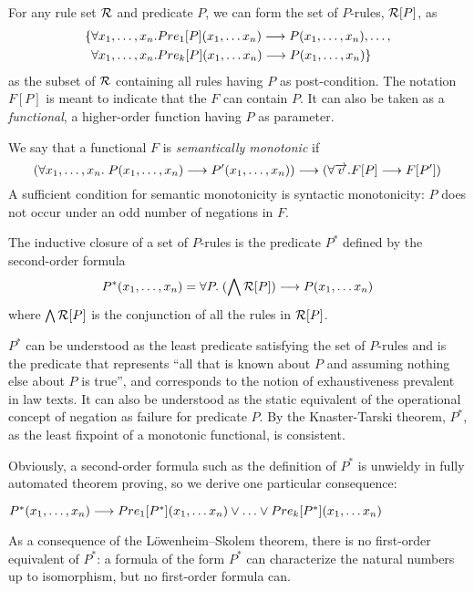 For any rule set $\cal R$ and predicate $P$, we can form the set of
$P$-rules, ${\cal R}[P]$, as
\begin{align*}
\{ & \forall x_1, \dots, x_n. Pre_1[P](x_1, \dots x_n) \longrightarrow P(x_1, \dots, x_n),
     \dots,\\
  & \forall x_1, \dots, x_n.Pre_k[P](x_1, \dots x_n)\longrightarrow P(x_1, \dots,
x_n)\}
\end{align*}
as the subset of $\cal R$ containing all rules having $P$ as
post-condition. The notation $F[P]$ is meant to indicate that the $F$ can
contain $P$. It can also be taken as a \emph{functional}, \ie{} a higher-order
function having $P$ as parameter.

We say that a functional $F$ is \emph{semantically monotonic} if
\[
  (\forall x_1, \dots, x_n.\; P(x_1, \dots, x_n) \longrightarrow P'(x_1, \dots, x_n)) \longrightarrow 
  (\forall \overrightarrow{v}. F[P] \longrightarrow F[P'])
\]
A sufficient condition for semantic monotonicity is syntactic monotonicity:
$P$ does not occur under an odd number of negations in $F$. 

The inductive closure of a set of $P$-rules is the predicate $P^*$ defined by
the second-order formula
\[  P^*(x_1, \dots, x_n) = \forall P.\; (\bigwedge{\cal R}[P]) \IMPL P(x_1, \dots x_n) \]
where $\bigwedge{\cal R}[P]$ is the conjunction of all the rules in ${\cal R}[P]$.

$P^*$ can be understood as the least predicate satisfying the set of $P$-rules
and is the predicate that represents ``all that is known about $P$ and
assuming nothing else about $P$ is true'', and corresponds to the notion of
exhaustiveness prevalent in law texts. It can also be understood as the static
equivalent of the operational concept of negation as failure for predicate
$P$.  By the Knaster-Tarski theorem, $P^*$, as the least fixpoint of a
monotonic functional, is consistent.

Obviously, a second-order formula such as the definition of $P^*$ is unwieldy
in fully automated theorem proving, so we derive one particular consequence:

\begin{proposition}\label{lemma:p_star}
$P^*(x_1, \dots, x_n) \IMPL Pre_1[P^*](x_1, \dots x_n) \OR \dots \OR Pre_k[P^*](x_1, \dots x_n)$
\end{proposition}
As a consequence of the Löwenheim–Skolem theorem, there is no first-order
equivalent of $P^*$: a formula of the form $P^*$ can characterize the natural
numbers up to isomorphism, but no first-order formula can.

